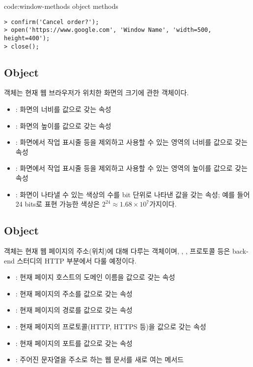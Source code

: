 \begin{code}{code:window-methods}{ object methods}
\begin{verbatim}
> confirm('Cancel order?');
> open('https://www.google.com', 'Window Name', 'width=500, height=400');
> close();
\end{verbatim}
\end{code}
\clearpage

\subsection*{ Object}

 객체는 현재 웹 브라우저가 위치한 화면의 크기에 관한 객체이다.

\begin{itemize}
    \item {}: 화면의 너비를 값으로 갖는 속성
    \item {}: 화면의 높이를 값으로 갖는 속성
    \item {}: 화면에서 작업 표시줄 등을 제외하고 사용할 수 있는 영역의 너비를 값으로 갖는 속성
    \item {}: 화면에서 작업 표시줄 등을 제외하고 사용할 수 있는 영역의 높이를 값으로 갖는 속성
    \item {}: 화면이 나타낼 수 있는 색상의 수를 bit 단위로 나타낸 값을 갖는 속성; 예를 들어 24 bits로 표현 가능한 색상은 $2^{24} \approx 1.68 \times 10^7$가지이다.
\end{itemize}

\subsection*{ Object}

 객체는 현재 웹 페이지의 주소(위치)에 대해 다루는 객체이며, , , 프로토콜 등은 back-end 스터디의 HTTP 부분에서 다룰 예정이다.

\begin{itemize}
    \item {}: 현재 페이지 호스트의 도메인 이름을 값으로 갖는 속성
    \item {}: 현재 페이지의 주소를 값으로 갖는 속성
    \item {}: 현재 페이지의 경로를 값으로 갖는 속성
    \item {}: 현재 페이지의 프로토콜(HTTP, HTTPS 등)을 값으로 갖는 속성
    \item {}: 현재 페이지의 포트를 값으로 갖는 속성
    \item {}: 주어진 문자열을 주소로 하는 웹 문서를 새로 여는 메서드
\end{itemize}

